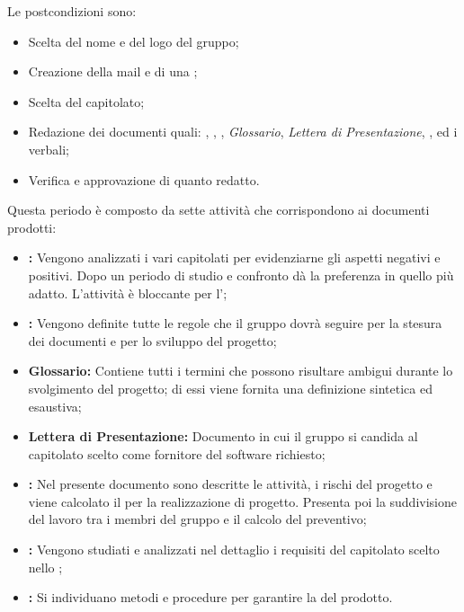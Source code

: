 Le postcondizioni sono:
\begin{itemize}
    \item Scelta del nome e del logo del gruppo;
    \item Creazione della mail e di una  ;
    \item Scelta del capitolato;
    \item Redazione dei documenti quali: \textit{\SdF}, \textit{\NdP}, \textit{\PdP}, \textit{Glossario}, \textit{Lettera di Presentazione}, \textit{\PdQ}, \textit{\AdR} ed i verbali;
    \item Verifica e approvazione di quanto redatto.
\end{itemize}
Questa periodo è composto da sette attività che corrispondono ai documenti prodotti:
\begin{itemize}
    \item \textbf{\SdF:} Vengono analizzati i vari capitolati per evidenziarne gli aspetti negativi e positivi. Dopo un periodo di studio e confronto {\Gruppo} dà la preferenza in quello più adatto. L'attività è bloccante per l'\textit{\AdR};

    \item \textbf{\NdP:} Vengono definite tutte le regole che il gruppo {\Gruppo} dovrà seguire per la stesura dei documenti e per lo sviluppo del progetto;

    \item \textbf{Glossario:} Contiene tutti i termini che possono risultare ambigui durante lo svolgimento del progetto; di essi viene fornita una definizione sintetica ed esaustiva;

    \item \textbf{Lettera di Presentazione:} Documento in cui il gruppo {\Gruppo} si candida al capitolato scelto come fornitore del  software richiesto;

    \item \textbf{\PdP:} Nel presente documento sono descritte le attività, i rischi del progetto e viene calcolato il  per la realizzazione di progetto. Presenta poi la suddivisione del lavoro tra i membri del gruppo {\Gruppo} e il calcolo del preventivo;

    \item \textbf{\AdR:} Vengono studiati e analizzati nel dettaglio i requisiti del capitolato scelto nello \textit{\SdF};

    \item \textbf{\PdQ:} Si individuano metodi e procedure per garantire la  del prodotto.
\end{itemize}
